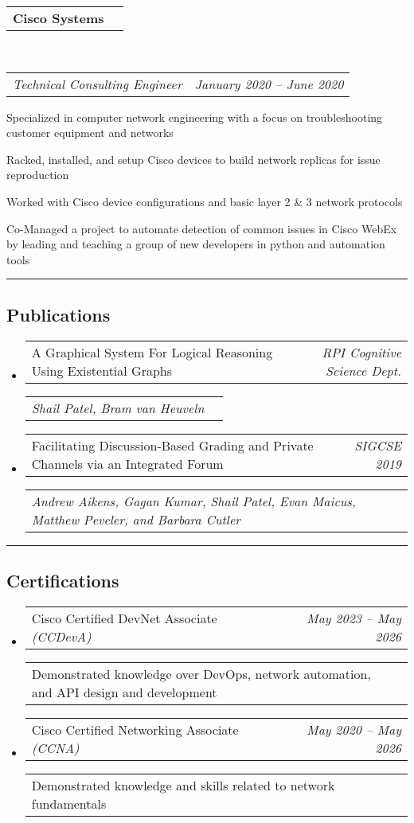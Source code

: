 \documentclass[10pt,letterpaper]{article}
\makeatletter
\newcommand{\headerrow}[2]
{\begin{tabular*}{\linewidth}{l@{\extracolsep{\fill}}r}
	#1 &
	#2 \\
\end{tabular*}}
\makeatother
\begin{document}
\begin{itemize}
	\headerrow
		{\textbf{Cisco Systems}}
		{}
	\\
	\headerrow
		{\emph{Technical Consulting Engineer}}
		{\emph{January 2020 -- June 2020}}

\end{itemize}

\hrule
\subsection*{Publications}
\begin{itemize}
	\item
		\headerrow
		{A Graphical System For Logical Reasoning Using Existential Graphs}
		{\emph{RPI Cognitive Science Dept.}}
		\headerrow
		{\emph{Shail Patel, Bram van Heuveln}}
		{}
	\item
		\headerrow
		{Facilitating Discussion-Based Grading and Private Channels via an Integrated Forum}
		{\emph {SIGCSE 2019}}
		\headerrow
		{\emph {Andrew Aikens, Gagan Kumar, Shail Patel, Evan Maicus, Matthew Peveler, and Barbara Cutler}}
		{}
\end{itemize}
\vspace{-0.1em}
\hrule
\vspace{-0.25em}
\subsection*{Certifications}
\begin{itemize}
    \item 
        \headerrow
        {Cisco Certified DevNet Associate \emph{(CCDevA)}}
	    {\emph{May 2023 -- May 2026}}
	    \headerrow
	    {Demonstrated knowledge over DevOps, network automation, and API design and development}
	    {}
    \item 
        \headerrow
	    {Cisco Certified Networking Associate \emph{(CCNA)}}
	    {\emph{May 2020 -- May 2026}}
	    \headerrow
	    {Demonstrated knowledge and skills related to network fundamentals}
	    {}
\end{itemize}
\end{document}
